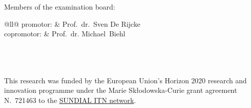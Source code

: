 \clearpage
\thispagestyle{empty}
\null%
\label{thesis:committee}
\vfill
{}

\noindent Members of the examination board:

\medskip\noindent
\begin{tabular}{@{}ll@{}}
  \quad{}promotor: & Prof.\ dr.\ Sven De Rijcke \\
  \quad{}copromotor: & Prof.\ dr. Michael\ Biehl\\
\\
 \\
\\
\end{tabular}

This research was funded by the European Union's Horizon 2020 research and innovation programme under the Marie Sk\l odowska-Curie
grant agreement N.~721463 to the \href{www.astro.rug.nl/~sundial}{SUNDIAL ITN network}.
